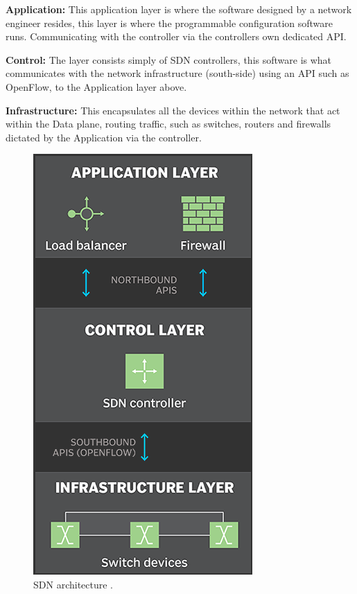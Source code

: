 \documentclass[12pt, oneside]{book}
\begin{document}
\begin{minipage}{0.5\textwidth}
		
		\textbf{Application:} This application layer is where the software designed by a network engineer
		resides, this layer is where the programmable configuration software runs. Communicating with the
		controller via the controllers own dedicated API. \newline

		\textbf{Control:} The layer consists simply of SDN controllers, this software is what
		communicates with the network infrastructure (south-side) using an API such as
		OpenFlow\cite{mckeown2008openflow}, to the Application layer above. \newline

		\textbf{Infrastructure:} This encapsulates all the devices within the network that act within the Data plane, routing traffic,
		such as switches, routers and firewalls dictated by the Application via the controller. \newline

\end{minipage} \hfill
\begin{minipage}{0.40\textwidth}
	\begin{figure}[H]
		\centering
		\includegraphics[scale=0.45]{images/sdn_architecture.png}
		\caption{SDN architecture \cite{rouse_2019}.}
		\label{fig:sdnarch}
	\end{figure}
\end{minipage}
\end{document}
